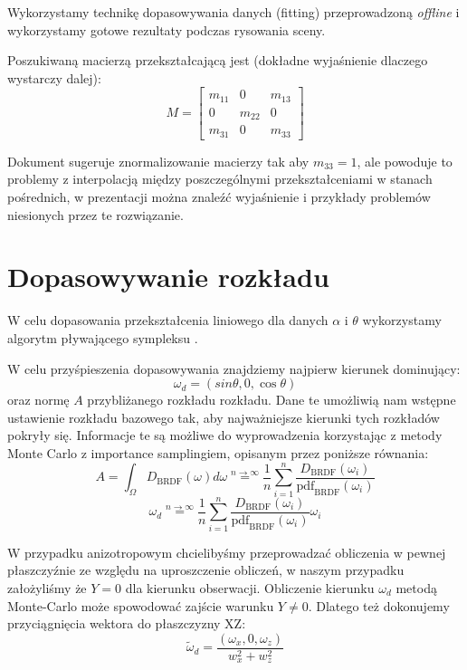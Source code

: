\documentclass[../main.tex]{subfiles}
\begin{document}
Wykorzystamy technikę dopasowywania danych (fitting) przeprowadzoną
\textit{offline} i wykorzystamy gotowe rezultaty podczas rysowania sceny.

Poszukiwaną macierzą przekształcającą jest (dokładne wyjaśnienie dlaczego
wystarczy dalej):
\[
M =
\begin{bmatrix}
  m_{11} & 0 & m_{13} \\
  0 & m_{22} & 0 \\
  m_{31} & 0 & m_{33}
\end{bmatrix}
\]

Dokument \cite{ltc_heitz} sugeruje znormalizowanie macierzy tak aby $m_{33}=1$,
ale powoduje to problemy z interpolacją między poszczególnymi przekształceniami
w stanach pośrednich, w prezentacji \cite{LTCJourneyPresentation} można znaleźć
wyjaśnienie i przykłady problemów niesionych przez te rozwiązanie.

\section{Dopasowywanie rozkładu}

W celu dopasowania przekształcenia liniowego dla danych $\alpha$
i $\theta$ wykorzystamy algorytm pływającego sympleksu \cite{NelderMead65}.

W celu przyśpieszenia dopasowywania znajdziemy najpierw kierunek dominujący:
\[ \omega_d = \left(sin\theta, 0, \cos\theta\right) \]
\noindent oraz normę $A$ przybliżanego rozkładu rozkładu. Dane te umożliwią nam wstępne
ustawienie rozkładu bazowego tak, aby najważniejsze kierunki tych rozkładów
pokryły się. Informacje te są możliwe do wyprowadzenia korzystając z metody
Monte Carlo z importance samplingiem, opisanym przez poniższe równania:
\[
A = \int_{\Omega} D_{\text{BRDF}}(\omega)d\omega
\stackrel{n \rightarrow \infty}{=}
\frac{1}{n} \sum_{i=1}^{n} {
  \frac{
    D_{\text{BRDF}}(\omega_i)
  }{
    \text{pdf}_{\text{BRDF}}(\omega_i)
  }
}
\]
\[
\omega_d
\stackrel{n \rightarrow \infty}{=}
\frac{1}{n} \sum_{i=1}^{n} {
  \frac{
    D_{\text{BRDF}}(\omega_i)
  }{
    \text{pdf}_{\text{BRDF}}(\omega_i)
  }
  \omega_i
}
\]

W przypadku anizotropowym chcielibyśmy przeprowadzać obliczenia w pewnej
płaszczyźnie ze względu na uproszczenie obliczeń, w naszym przypadku
założyliśmy że $Y=0$ dla kierunku obserwacji. 
Obliczenie kierunku $\omega_d$ metodą Monte-Carlo może spowodować zajście
warunku $Y \neq 0$. Dlatego też dokonujemy przyciągnięcia wektora do
płaszczyzny XZ:
\[
\widetilde{\omega}_d = \frac{
    \left( \omega_x,0,\omega_z \right)
  }{
    w_x^2+w_z^2
  }
\]
\end{document}
